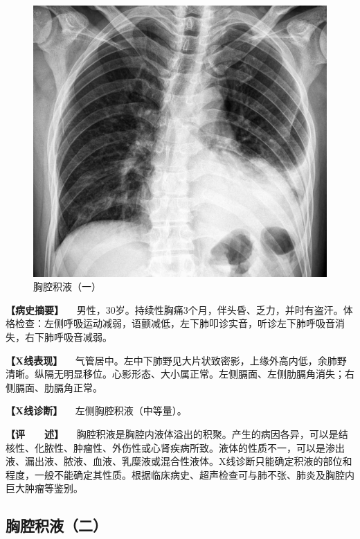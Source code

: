 \begin{figure}[!htbp]
 \centering
 \includegraphics{./images/Image00187.jpg}
 \captionsetup{justification=centering}
 \caption{胸腔积液（一）}
 \label{fig3-11-1}
  \end{figure} 

\textbf{【病史摘要】}
　男性，30岁。持续性胸痛3个月，伴头昏、乏力，并时有盗汗。体格检查：左侧呼吸运动减弱，语颤减低，左下肺叩诊实音，听诊左下肺呼吸音消失，右下肺呼吸音减弱。

\textbf{【X线表现】}
　气管居中。左中下肺野见大片状致密影，上缘外高内低，余肺野清晰。纵隔无明显移位。心影形态、大小属正常。左侧膈面、左侧肋膈角消失；右侧膈面、肋膈角正常。

\textbf{【X线诊断】} 　左侧胸腔积液（中等量）。

\textbf{【评　　述】}
　胸腔积液是胸腔内液体溢出的积聚。产生的病因各异，可以是结核性、化脓性、肿瘤性、外伤性或心肾疾病所致。液体的性质不一，可以是渗出液、漏出液、脓液、血液、乳糜液或混合性液体。X线诊断只能确定积液的部位和程度，一般不能确定其性质。根据临床病史、超声检查可与肺不张、肺炎及胸腔内巨大肿瘤等鉴别。

\subsection{胸腔积液（二）}

